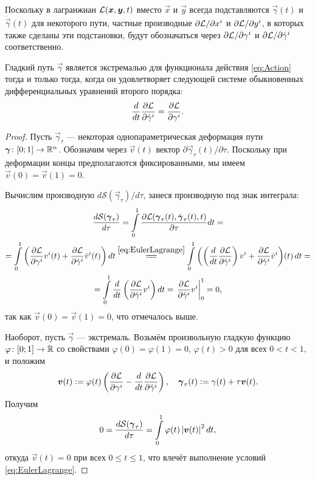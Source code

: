 Поскольку в лагранжиан $\mathcal{L}(\boldsymbol{x}, \boldsymbol{y}, t)$ вместо $\vec{x}$ и $\vec{y}$ всегда подставляются $\vec{\gamma}(t)$ и $\dot{\vec{\gamma}}(t)$ для некоторого пути, частные производные $\partial\mathcal{L} / \partial x^i$ и $\partial\mathcal{L} / \partial y^i$, в которых также сделаны эти подстановки, будут обозначаться через $\partial\mathcal{L} / \partial\gamma^i$ и $\partial\mathcal{L} / \partial\dot{\gamma}^i$ соответственно.

\begin{lemma}
	Гладкий путь $\vec{\gamma}$ является экстремалью для функционала действия \eqref{eq:Action} тогда и только тогда, когда он удовлетворяет следующей системе обыкновенных дифференциальных уравнений второго порядка:
	\begin{equation} \label{eq:EulerLagrange}
		\frac{d}{dt}\frac{\partial\mathcal{L}}{\partial\dot{\gamma}^i} = \frac{\partial\mathcal{L}}{\partial\gamma^i}.
	\end{equation}
\end{lemma}

\begin{proof}
	Пусть $\vec{\gamma}_\tau$ --- некоторая однопараметрическая деформация пути $\vec{\gamma}\colon [0; 1] \hm\to \R^n$. Обозначим через $\vec{v}(t)$ вектор $\partial\vec{\gamma}_\tau(t) / \partial\tau$. Поскольку при деформации концы предполагаются фиксированными, мы имеем $\vec{v}(0) = \vec{v}(1) = 0$.

	Вычислим производную $d\mathcal{S}(\vec{\gamma}_\tau) / d\tau$, занеся производную под знак интеграла:
	\begin{multline*}
		\frac{d\mathcal{S}(\vec{\gamma}_\tau)}{d\tau} = \int\limits_0^1\frac{\partial\L(\vec{\gamma}_\tau(t), \dot{\vec{\gamma}}_\tau(t), t)}{\partial\tau}dt =\\ = \int\limits_0^1\br{\frac{\partial\L}{\partial\gamma^i}v^i(t) + \frac{\partial\L}{\partial\dot{\gamma}^i}\dot{v}^i(t)}dt \stackrel{\eqref{eq:EulerLagrange}}{=\joinrel=} \int\limits_0^1\br{\br{\frac{d}{dt}\frac{\partial\L}{\partial\dot{\gamma}^i}}v^i + \frac{\partial\L}{\partial\dot{\gamma}^i}\dot{v}^i}\!(t)\,dt =\\ = \int\limits_0^1\frac{d}{dt}\br{\frac{\partial\L}{\partial\dot{\gamma}^i}v^i}dt = \left.\frac{\partial\L}{\partial\dot{\gamma}^i}v^i\right|_0^1 = 0,
	\end{multline*}
	так как $\vec{v}(0) = \vec{v}(1) = 0$, что отмечалось выше.

	Наоборот, пусть $\vec{\gamma}$ --- экстремаль. Возьмём произвольную гладкую функцию $\varphi\colon [0; 1] \to \mathbb{R}$ со свойствами $\varphi(0) = \varphi(1) = 0$, $\varphi(t) > 0$ для всех $0 < t < 1$, и положим
	\[
		\boldsymbol{v}(t) \vcentcolon = \varphi(t)\left(\frac{\partial\mathcal{L}}{\partial\gamma^i} - \frac{d}{dt}\frac{\partial\mathcal{L}}{\partial\dot{\gamma}^i}\right),\quad \boldsymbol{\gamma}_\tau(t) \vcentcolon = \gamma(t) + \tau\boldsymbol{v}(t).
	\]
	Получим
	\[
		0 = \frac{d\mathcal{S}(\boldsymbol{\gamma}_\tau)}{d\tau} = \int\limits_0^1\varphi(t)\left\lvert\boldsymbol{v}(t)\right\rvert^2dt,
	\]
	откуда $\vec{v}(t) = 0$ при всех $0 \leqslant t \leqslant 1$, что влечёт выполнение условий \eqref{eq:EulerLagrange}.
\end{proof}

